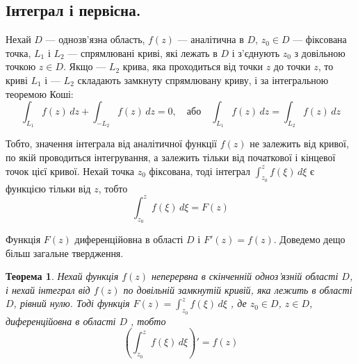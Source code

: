 \documentclass[12pt,fleqn]{article}
\theoremstyle{theorem}
\newtheorem{thm}{Теорема}[section]
\theoremstyle{proof}
\numberwithin{figure}{section}
\numberwithin{equation}{section}
\begin{document}
\newpage

\subsection{Інтеграл і первісна.}\label{8.5}\allowdisplaybreaks

Нехай $D$ --- однозв'язна область, $f(z)$ --- аналітична в $D$, $z_0 \in D$ --- фіксована точка, $L_1$ і $L_2$ --- спрямлювані криві, які лежать в $D$ і з'єднують $z_0$ з довільною точкою $z \in D$. Якщо --- $L_2$ крива, яка проходиться від точки $z$ до точки $z$, то криві $L_1$ і --- $L_2$ складають замкнуту спрямлювану криву, і за інтегральною теоремою Коші:
\[ \int_{L_1}f(z)\,dz + \int_{-L_2}f(z)\,dz=0, \quad \text{або} \quad \int_{L_1}f(z)\,dz=\int_{L_2}f(z)\,dz \]

Тобто, значення інтеграла від аналітичної функції $f(z)$ не залежить від кривої, по якій проводиться інтегрування, а залежить тільки від початкової і кінцевої точок цієї кривої. Нехай точка $z_0$ фіксована, тоді інтеграл $\int_{z_0}^{z} f(\xi) \,d\xi$ є функцією тільки від $z$, тобто
\begin{equation}\label{8.5.1}
\int_{z_0}^{z} f(\xi) \,d\xi = F(z)
\end{equation}

Функція $F(z)$ диференційовна в області $D$ і $F'(z)=f(z)$. Доведемо дещо більш загальне твердження.

\begin{thm}\label{theor_8.5.1}
Нехай функція $f(z)$ неперервна в скінченній одноз'язній області $D$, і нехай інтеграл від $f(z)$ по довільній замкнутій кривій, яка лежить в області $D$, рівний нулю. Тоді функція $F(z)= \int_{z_0}^{z} f(\xi) \,d\xi$ , де $z_0 \in D$, $z \in D$, диференційовна в області $D$ , тобто
\[ \left(\int_{z_0}^{z} f(\xi) \,d\xi\right)' = f(z) \]

\end{thm}
\end{document}
